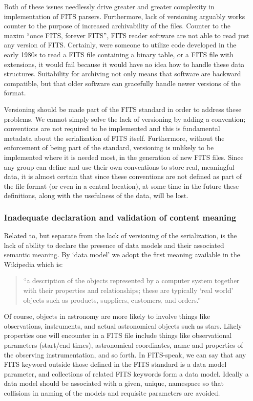 \documentclass[final,authoryear,5p,times,twocolumn]{elsarticle}
\begin{document}
Both of these issues needlessly drive greater and greater complexity
in implementation of FITS parsers. Furthermore, lack of versioning
arguably works counter to the purpose of increased archivability of
the files. Counter to the maxim ``once FITS, forever FITS'', FITS reader
software are not able to read just any version of FITS. Certainly,
were someone to utilize code developed in the early 1980s to read a
FITS file containing a binary table, or a FITS file with extensions,
it would fail because it would have no idea how to handle these data
structures. Suitability for archiving not only means that software are
backward compatible, but that older software can gracefully handle
newer versions of the format.


Versioning should be made part of the FITS standard in order to
address these problems. We cannot simply solve the lack of versioning
by adding a convention; conventions are not required to be implemented
and this is fundamental metadata about the serialization of FITS
itself. Furthermore, without the enforcement of being part of the
standard, versioning is unlikely to be implemented where it is needed
most, in the generation of new FITS files. Since any group can define
and use their own conventions to store real, meaningful data, it is
almost certain that since these conventions are not defined as part of
the file format (or even in a central location), at some time in the
future these definitions, along with the usefulness of the data, will
be lost.


\subsubsection{Inadequate declaration and validation of content meaning}


Related to, but separate from the lack of versioning of the
serialization, is the lack of ability to declare the presence of data
models and their associated semantic meaning.  By `data model' we
adopt the first meaning available in the Wikipedia which is:

\begin{quote}
``a description of the objects represented by a computer system
together with their properties and relationships; these are typically
`real world' objects such as products, suppliers, customers, and
orders.''
\end{quote}


Of course, objects in astronomy are more likely to involve things like
observations, instruments, and actual astronomical objects such as
stars. Likely properties one will encounter in a FITS file include
things like observational parameters (start/end times), astronomical
coordinates, name and properties of the observing instrumentation, and
so forth. In FITS-speak, we can say that any FITS keyword outside
those defined in the FITS standard is a data model parameter, and
collections of related FITS keywords form a data model. Ideally a data
model should be associated with a given, unique, namespace so that
collisions in naming of the models and requisite parameters are
avoided.
\end{document}
